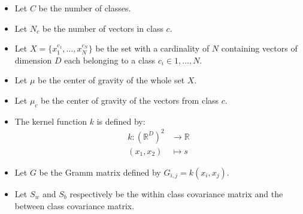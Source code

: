 
\begin{itemize}
  \item Let $C$ be the number of classes.
  \item Let $N_c$ be the number of vectors in class $c$.
  \item Let $X = \{x^{c_1}_1, \ldots, x^{c_N}_N\}$ be the set with a cardinality of $N$ containing
  vectors of dimension $D$ each belonging to a class $c_i \in {1, ..., N}$.
  \item Let $\mu$ be the center of gravity of the whole set $X$.
  \item Let $\mu_c$ be the center of gravity of the vectors from class $c$.
  \item The kernel function $k$ is defined by:
  	\begin{align*}
   		k : \left(\mathbb{R}^D\right)^2 &\to \mathbb{R}\\
   		(x_1, x_2) &\mapsto s 
   	\end{align*}
  \item Let $G$ be the Gramm matrix defined by $G_{i,j} = k(x_i, x_j)$.
  \item Let $S_w$ and $S_b$ respectively be the within class covariance matrix and the between class covariance matrix. 
\end{itemize}
